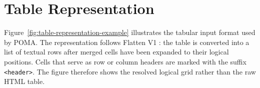 
\section{Table Representation}\label{app:table-representation}

Figure~\ref{fig:table-representation-example} illustrates the tabular input format used by POMA. The representation follows Flatten V1 \citep{openvitabqa2025}: the table is converted into a list of textual rows after merged cells have been expanded to their logical positions. Cells that serve as row or column headers are marked with the suffix \texttt{<header>}. The figure therefore shows the resolved logical grid rather than the raw HTML table.


